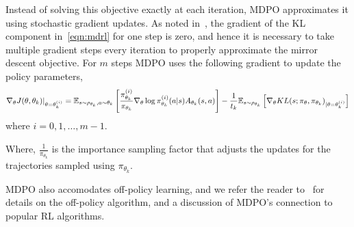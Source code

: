 Instead of solving this objective exactly at each iteration,
MDPO approximates it using stochastic gradient updates.
As noted in~\cite{tomarMirror2022}, the gradient of the KL component in~\ref{eqn:mdrl} for one step
is zero, and hence it is necessary to take multiple gradient steps every iteration to properly
approximate the mirror descent objective.
For $m$ steps MDPO uses the following gradient to update the policy parameters,
\begin{equation}
	\label{eqn:mdpograd} \nabla_{\theta} J(\theta, \theta_k)|_{\theta = \theta_k^{(i)}} = \mathbb{E}_{s \sim
		\rho_{\theta_k}, a \sim \theta_k} \left[ \frac{ \pi_{\theta_k}^{(i)}}{ \pi_{\theta_k}}
		\nabla_{\theta} \log \pi_{\theta_k}^{(i)} (a|s) A_{\theta_k}(s,a) \right] - \frac{1}{t_k} \mathbb{E}_{s
		\sim \rho_{\theta_k}} \left[\nabla_\theta KL(s; \pi_\theta, \pi_{\theta_k})_{|\theta=
				\theta_k^{(i)}} \right]
\end{equation} where $i=0,1,\ldots,m-1$.

Where, $\frac{1}{\pi_{\theta_k}}$ is the importance sampling factor that adjusts the updates for
the trajectories sampled using $\pi_{\theta_k}$.

MDPO also accomodates off-policy learning, and we refer the reader to~\cite{tomarMirror2022} for
details on the off-policy algorithm, and a discussion of MDPO's connection to popular RL
algorithms.

